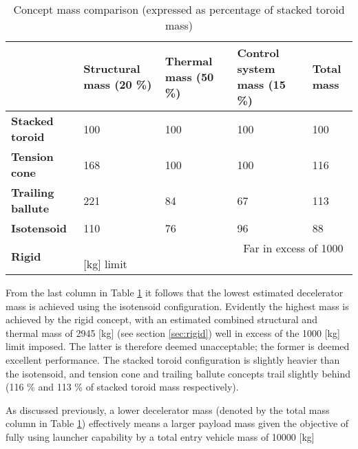 \begin{table}[h]
\centering
\caption{Concept mass comparison (expressed as percentage of stacked toroid mass)}\label{tab:cmass}
\begin{tabular}{|p{}|p{}|p{}|p{}||p{}|}

\hline
                          & \textbf{Structural mass (20 \%)} & \textbf{Thermal mass (50 \%)} & \textbf{Control system mass (15 \%)} & \textbf{Total mass} \\ \hline
\textbf{Stacked toroid}   &  100                                 & 100                          & 100                                      &\cellcolor{green!70}  100                           \\ \hline
\textbf{Tension cone}     &  168                               & 100                               &  100                                     &\cellcolor{yellow!70} 116                                 \\ \hline
\textbf{Trailing ballute} &  221                                 & 84                               & 67                                      &\cellcolor{yellow!70} 113 \\ \hline
\textbf{Isotensoid}       &  110                                 & 76                               & 96                                      &\cellcolor{green!70} 88 \\ \hline \hline
\textbf{Rigid}            &  \multicolumn{4}{|p{0.762\textwidth}|}{\cellcolor{red!60} ~~~~~~~~~~~~~~~~~~~~~~~~~~~~~Far in excess of 1000 [kg] limit}    \\ \hline
\end{tabular}
\end{table}

From the last column in Table \ref{tab:cmass} it follows that the lowest estimated decelerator mass is achieved using the isotensoid configuration. Evidently the highest mass is achieved by the rigid concept, with an estimated combined structural and thermal mass of 2945 [kg] (see section \ref{sec:rigid}) well in excess of the 1000 [kg] limit imposed. The latter is therefore deemed unacceptable; the former is deemed excellent performance. The stacked toroid configuration is slightly heavier than the isotensoid, and tension cone and trailing ballute concepts trail slightly behind (116 \% and 113 \% of stacked toroid mass respectively).

As discussed previously, a lower decelerator mass (denoted by the total mass column in Table \ref{tab:cmass}) effectively means a larger payload mass given the objective of fully using launcher capability by a total entry vehicle mass of 10000 [kg]

